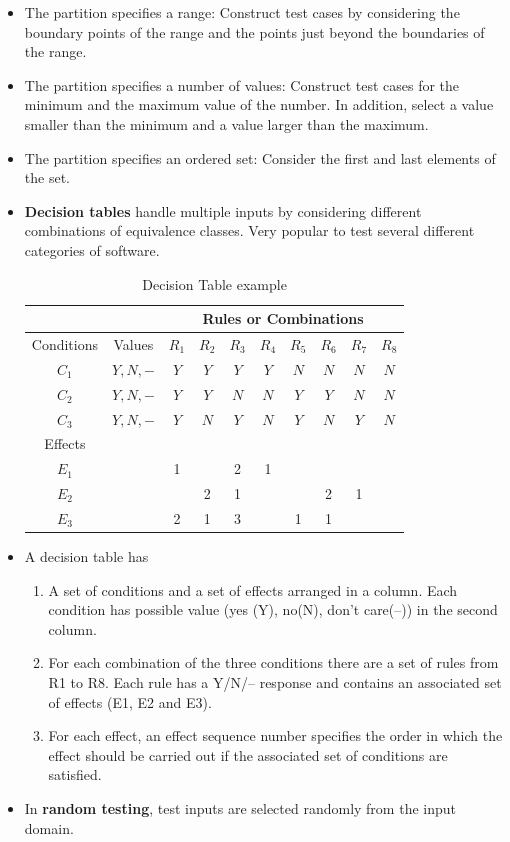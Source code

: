 \documentclass[a4paper]{article}
\begin{document}
\begin{itemize}
    \item The partition specifies a range: Construct test cases by considering the boundary points of the range and the points just beyond the boundaries of the range.
    \item The partition specifies a number of values: Construct test cases for the minimum and the maximum value of the number. In addition, select a value smaller than the minimum and a value larger than the maximum.
    \item The partition specifies an ordered set: Consider the first and last elements of the set.
    \item \textbf{Decision tables} handle multiple inputs by considering different combinations of equivalence classes. Very popular to test several different categories of software.
    \begin{table}[H]
        \centering
        \begin{tabular}{cccccccccc}
            \hline
              & & \multicolumn{8}{c}{Rules or Combinations}\\
             \hline
            Conditions & Values & $R_1$ & $R_2$ & $R_3$ & $R_4$ & $R_5$ & $R_6$ & $R_7$ & $R_8$\\
            \hline
            $C_1$ & $Y,N,-$ & $Y$ & $Y$ & $Y$ & $Y$ & $N$ & $N$ & $N$ & $N$\\
            $C_2$ & $Y,N,-$ & $Y$ & $Y$ & $N$ & $N$ & $Y$ & $Y$ & $N$ & $N$\\
            $C_3$ & $Y,N,-$ & $Y$ & $N$ & $Y$ & $N$ & $Y$ & $N$ & $Y$ & $N$\\
            Effects & \multicolumn{9}{c}{}\\
            $E_1$ & & 1 & & 2 & 1 & & & & \\
            $E_2$ & & & 2 & 1 & & & 2 & 1 & \\
            $E_3$ & & 2 & 1 & 3 & & 1 & 1 & & \\
            \hline
        \end{tabular}
        \caption{Decision Table example}
    \end{table}
    \item A decision table has
    \begin{enumerate}
        \item A set of conditions and a set of effects arranged in a column. Each condition has possible value (yes (Y), no(N), don’t care(–)) in the second column.
        \item For each combination of the three conditions there are a set of rules from R1 to R8. Each rule has a Y/N/– response and contains an associated set of effects (E1, E2 and E3).
        \item For each effect, an effect sequence number specifies the order in which the effect should be carried out if the associated set of conditions are satisfied.
    \end{enumerate}
    \item In \textbf{random testing}, test inputs are selected randomly from the input domain.
\end{itemize}
\end{document}
